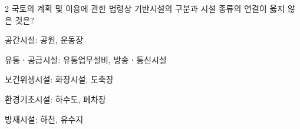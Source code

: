\begin{question}{2}
국토의 계획 및 이용에 관한 법령상 기반시설의 구분과 시설 종류의 연결이 옳지 않은 것은?
\begin{choices}
  \item 공간시설: 공원, 운동장
  \item 유통ㆍ공급시설: 유통업무설비, 방송ㆍ통신시설
  \item 보건위생시설: 화장시설, 도축장
  \item 환경기초시설: 하수도, 폐차장
  \item 방재시설: 하천, 유수지
\end{choices}
\end{question}
